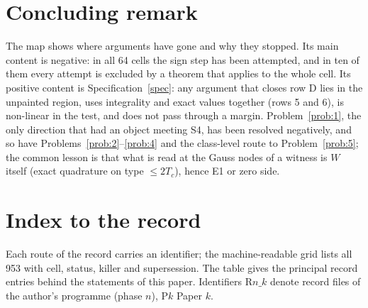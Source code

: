\documentclass[11pt]{amsart}
\theoremstyle{definition}
\theoremstyle{remark}
\begin{document}
\section*{Concluding remark}
The map shows where arguments have gone and why they stopped. Its main content is negative: in all
64 cells the sign step has been attempted, and in ten of them every attempt is excluded by a theorem that
applies to the whole cell. Its positive content is Specification~\ref{spec}: any argument that closes row D
lies in the unpainted region, uses integrality and exact values together (rows 5 and 6), is non-linear in
the test, and does not pass through a margin. Problem~\ref{prob:1}, the only direction that had an object meeting S4, has been resolved
negatively, and so have Problems~\ref{prob:2}--\ref{prob:4} and the class-level route to Problem~\ref{prob:5}; the common lesson is that what is read at the Gauss
nodes of a witness is $W$ itself (exact quadrature on type $\le2T_c$), hence E1 or zero side.

\appendix
\section{Index to the record}\label{app:index}

Each route of the record carries an identifier; the machine-readable grid lists all 953 with cell, status,
killer and supersession. The table gives the principal record entries behind the statements of this paper.
Identifiers $\mathrm{R}n\_k$ denote record files of the author's programme (phase $n$), $\mathrm Pk$ Paper $k$.
\end{document}
